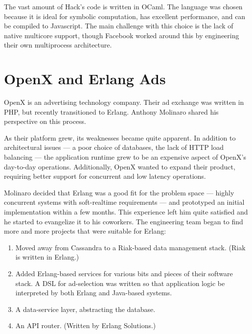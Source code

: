 \documentclass{jfp1}
\begin{document}
The vast amount of Hack's code is written in OCaml. The language was
chosen because it is ideal for symbolic computation, has excellent
performance, and can be compiled to Javascript.  The main
challenge with this choice is the lack of native multicore support, though
Facebook worked around this by engineering their own multiprocess
architecture.

\section{OpenX and Erlang Ads}


OpenX is an advertising technology company. Their ad exchange was
written in PHP, but recently transitioned to Erlang. Anthony Molinaro
shared his perspective on this process.

As their platform grew, its weaknesses became quite apparent. In
addition to architectural issues --- a poor choice of databases, the
lack of HTTP load balancing --- the application runtime grew to be an
expensive aspect of OpenX's day-to-day operations. Additionally, OpenX
wanted to expand their product, requiring better support for
concurrent and low latency operations.

Molinaro decided that Erlang was a good fit for the problem space ---
highly concurrent systems with soft-realtime requirements --- and
prototyped an initial implementation within a few months. This experience
left him quite satisfied and he started to evangelize it to his coworkers.
The engineering team began to find more and more projects that
were suitable for Erlang:

\begin{enumerate}

\item Moved away from Cassandra to a Riak-based data management
stack. (Riak is written in Erlang.)

\item Added Erlang-based services for various bits and pieces of their
software stack. A DSL for ad-selection was written so that application
logic be interpreted by both Erlang and Java-based systems.

\item A data-service layer, abstracting the database.

\item An API router. (Written by Erlang Solutions.)

\end{enumerate}
\end{document}

